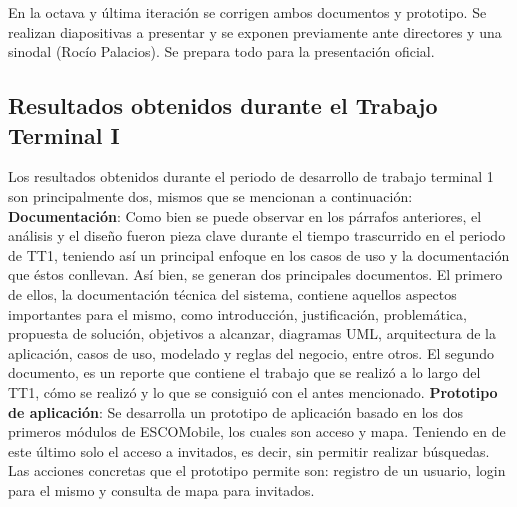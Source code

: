 \noindent
En la octava y última iteración se corrigen ambos documentos y prototipo. Se realizan diapositivas a presentar y se exponen previamente ante directores y una sinodal (Rocío Palacios). Se prepara todo para la presentación oficial.

\subsection{Resultados obtenidos durante el Trabajo Terminal I}

\noindent
Los resultados obtenidos durante el periodo de desarrollo de trabajo terminal 1 son principalmente dos, mismos que se mencionan a continuación:
\newline
\newline
\textbf{Documentación}: Como bien se puede observar en los párrafos anteriores, el análisis y el diseño fueron pieza clave durante el tiempo trascurrido en el periodo de TT1, teniendo así un principal enfoque en los casos de uso y la documentación que éstos conllevan. Así bien, se generan dos principales documentos. El primero de ellos, la documentación técnica del sistema, contiene aquellos aspectos importantes para el mismo, como introducción, justificación, problemática, propuesta de solución, objetivos a alcanzar, diagramas UML, arquitectura de la aplicación, casos de uso, modelado y reglas del negocio, entre otros. El segundo documento, es un reporte que contiene el trabajo que se realizó a lo largo del TT1, cómo se realizó y lo que se consiguió con el antes mencionado. 
\newline
\newline
\textbf{Prototipo de aplicación}: Se desarrolla un prototipo de aplicación basado en los dos primeros módulos de ESCOMobile, los cuales son acceso y mapa. Teniendo en de este último solo el acceso a invitados, es decir, sin permitir realizar búsquedas. Las acciones concretas que el prototipo permite son: registro de un usuario, login para el mismo y consulta de mapa para invitados.